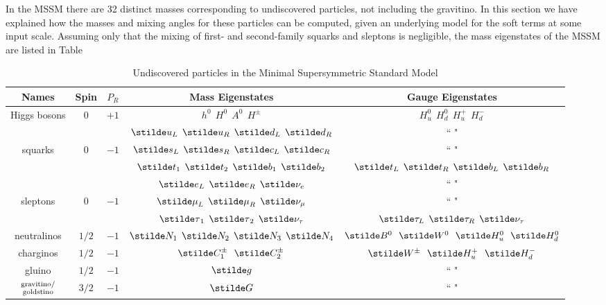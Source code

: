 In the MSSM there are 32 distinct masses corresponding to
undiscovered particles, not including the gravitino.
In this section we have explained how
the masses and mixing angles for these particles can be computed,
given an underlying model for the soft terms at some input scale.
Assuming only that the mixing of first- and second-family squarks and
sleptons is negligible,
the mass eigenstates of the MSSM are listed in Table
\renewcommand{\arraystretch}{1.4}
\begin{table}[tb]
\caption{
Undiscovered particles in the Minimal Supersymmetric Standard
Model\label{tab:undiscovered}}
\vspace{0.4cm}
\begin{center}
\begin{tabular}{|c|c|c|c|c|}
\hline
Names & Spin & $P_R$ & Mass Eigenstates & Gauge Eigenstates \\
\hline\hline
Higgs bosons& 0 &$+1$& $h^0\>\> H^0\>\> A^0 \>\> H^\pm$& $
H_u^0\>\> H_d^0\>\> H_u^+ \>\> H_d^-$ \\
\hline
& & &${\stilde u}_L\>\> {\stilde u}_R\>\> \stilde d_L\>\> \stilde d_R$&`` "
\\
squarks& 0&$-1$& ${\stilde s}_L\>\> {\stilde s}_R\>\> \stilde c_L\>\>
\stilde
c_R$& `` " \\
& & &${\stilde t}_1\>\> {\stilde t}_2\>\> \stilde b_1\>\> \stilde
b_2$&$\stilde
t_L \>\>
\stilde t_R \>\>\stilde b_L\>\> \stilde b_R$ \\
\hline
& & &${\stilde e}_L\>\> {\stilde e}_R \>\>\stilde \nu_e$&`` " \\
sleptons& 0&$-1$&${\stilde \mu}_L \>\>{\stilde \mu}_R\>\> \stilde
\nu_\mu$&
`` "
\\
& & &${\stilde \tau}_1 \>\>{\stilde \tau}_2 \>\>\stilde \nu_\tau$&
$\stilde \tau_L\>\> \stilde \tau_R \>\>\stilde \nu_\tau$ \\
\hline
neutralinos & $1/2$&$-1$ & $\stilde N_1\>\> \stilde N_2 \>\>\stilde N_3\>\>
\stilde
N_4$ &
$\stilde B^0 \>\>\>\stilde W^0\>\>\> \stilde H_u^0\>\>\> \stilde H_d^0$   \\
\hline
charginos & $1/2$&$-1$ & $\stilde C_1^\pm\>\>\>\stilde C_2^\pm $ &
$\stilde W^\pm\>\>\> \stilde H_u^+ \>\>\>\stilde H_d^-$ \\
\hline
gluino & $1/2$&$-1$ &$\stilde g$  &`` " \\
\hline
${\rm gravitino/}\atop{\rm goldstino}$ & $3/2$&$-1$&$\stilde G$  &`` " \\
\hline
\end{tabular}
\end{center}
\end{table}
